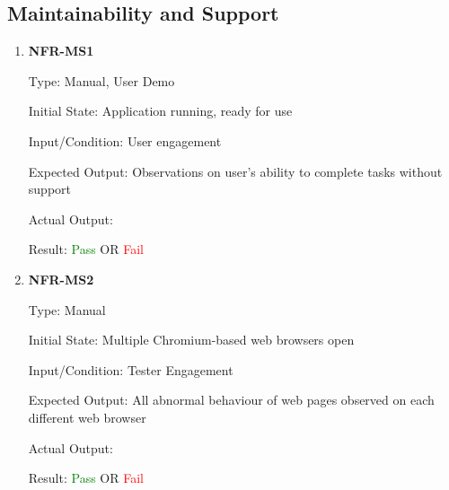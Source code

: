 \documentclass[12pt, titlepage]{article}
\begin{document}
\subsection{Maintainability and Support}
\begin{enumerate}
\item{\textbf{NFR-MS1}} \label{NFR:MS1}

Type: Manual, User Demo

Initial State: Application running, ready for use

Input/Condition: User engagement

Expected Output: Observations on user's ability to complete tasks without
support

Actual Output:

Result: \textcolor{green}{Pass} OR \textcolor{red}{Fail}
					
\item{\textbf{NFR-MS2}} \label{NFR:MS2}

Type: Manual

Initial State: Multiple Chromium-based web browsers open

Input/Condition: Tester Engagement

Expected Output: All abnormal behaviour of web pages observed on each different
web browser

Actual Output:

Result: \textcolor{green}{Pass} OR \textcolor{red}{Fail}
\end{enumerate}
\end{document}

